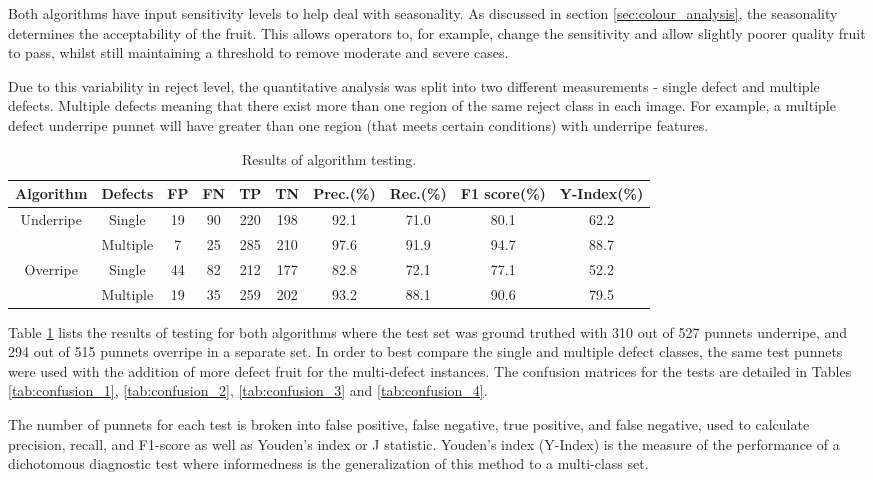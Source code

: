\documentclass[fleqn,twoside,12pt]{report}
\begin{document}
Both algorithms have input sensitivity levels to help deal with seasonality. As discussed in section \ref{sec:colour_analysis}, the seasonality determines the acceptability of the fruit. This allows operators to, for example, change the sensitivity and allow slightly poorer quality fruit to pass, whilst still maintaining a threshold to remove moderate and severe cases.

Due to this variability in reject level, the quantitative analysis was split into two different measurements - single defect and multiple defects. Multiple defects meaning that there exist more than one region of the same reject class in each image. For example, a multiple defect underripe punnet will have greater than one region (that meets certain conditions) with underripe features.

\begin{table}[h]
	\centering
	\caption{Results of algorithm testing.}
	\label{tab:algo_test}
	\begin{tabular}{@{}c*{8}{c}c@{}}
		\toprule
		Algorithm & Defects & FP  & FN  & TP  & TN  & Prec.(\%) & Rec.(\%) & F1 score(\%) & Y-Index(\%)\\ 
		\midrule
		Underripe   & Single   & 19 & 90 & 220 & 198 & 92.1 & 71.0 & 80.1 & 62.2 \\[6pt] 
		& Multiple & 7  & 25 & 285 & 210 & 97.6 & 91.9 & 94.7 & 88.7 \\[6pt]
		Overripe    & Single   & 44 & 82 & 212 & 177 & 82.8 & 72.1 & 77.1 & 52.2 \\[6pt]
		& Multiple & 19 & 35 & 259 & 202 & 93.2 & 88.1 & 90.6 & 79.5 \\[6pt]	 
		\bottomrule
	\end{tabular}
\end{table}


Table \ref{tab:algo_test} lists the results of testing for both algorithms where the test set was ground truthed with 310 out of 527 punnets underripe, and 294 out of 515 punnets overripe in a separate set. In order to best compare the single and multiple defect classes, the same test punnets were used with the addition of more defect fruit for the multi-defect instances. The confusion matrices for the tests are detailed in Tables \ref{tab:confusion_1},  \ref{tab:confusion_2}, \ref{tab:confusion_3} and \ref{tab:confusion_4}.

The number of punnets for each test is broken into false positive, false negative, true positive, and false negative, used to calculate precision, recall, and F1-score as well as Youden's index or J statistic. Youden's index (Y-Index) is the measure of the performance of a dichotomous diagnostic test where informedness is the generalization of this method to a multi-class set.
\end{document}
